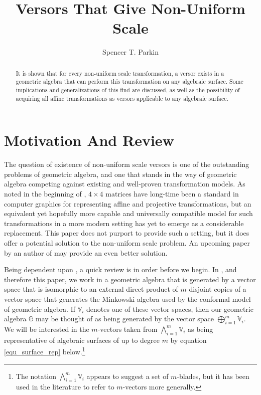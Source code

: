 \documentclass{birkjour}
\theoremstyle{definition}
\theoremstyle{remark}
\numberwithin{equation}{section}
\newcommand{\G}{\mathbb{G}}
\newcommand{\V}{\mathbb{V}}
\begin{document}
\title{Versors That Give Non-Uniform Scale}

\author{Spencer T. Parkin}
\address{102 W. 500 S., \\
Salt Lake City, UT  84101} 



\begin{abstract}
It is shown that for every non-uniform scale transformation, a versor
exists in a geometric algebra that can perform this transformation
on any algebraic surface.  Some implications and generalizations of this find are discussed,
as well as the possibility of acquiring all affine transformations as versors applicable
to any algebraic surface.
\end{abstract}


\maketitle

\section{Motivation And Review}

The question of existence of non-uniform scale versors is one of the outstanding problems of geometric algebra,
and one that stands in the way of geometric algebra competing against existing and well-proven transformation models.
As noted in the beginning of \cite{Goldman12}, $4\times 4$ matrices have long-time been a standard
in computer graphics for representing affine and projective transformations, but an
equivalent yet hopefully more capable and universally compatible model for such transformations in a more modern setting has yet to emerge
as a considerable replacement.  This paper does not purport to provide such a setting,
but it does offer a potential solution to the non-uniform scale problem.
An upcoming paper by an author of \cite{Dorst07} may provide an even better solution.

Being dependent upon \cite{Parkin13}, a quick review is in order before we begin.
In \cite{Parkin13}, and therefore this paper, we work in a geometric algebra that is generated
by a vector space that is isomorphic to an external direct product of $m$ disjoint copies of a vector space
that generates the Minkowski algebra used by the conformal model of geometric algebra.  If $\V_i$ denotes one of these vector spaces,
then our geometric algebra $\G$ may be thought of as being generated by the vector space $\bigoplus_{i=1}^m\V_i$.
We will be interested in the $m$-vectors
taken from $\bigwedge_{i=1}^m \V_i$ as being representative of algebraic surfaces
of up to degree $m$ by equation \eqref{equ_surface_rep} below.\footnote{The notation $\bigwedge_{i=1}^m\V_i$
appears to suggest a set of $m$-blades, but it has been used in the literature to refer to $m$-vectors more generally.}
\end{document}
